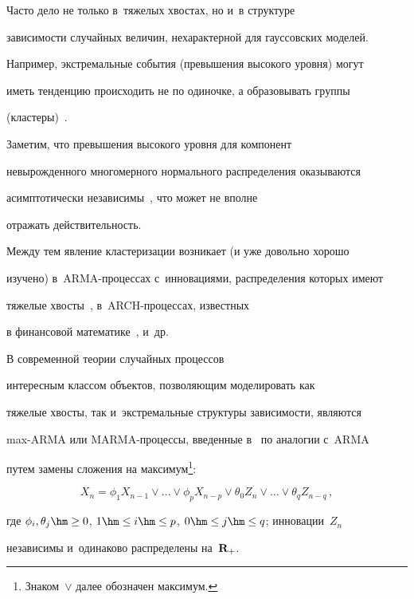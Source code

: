 Часто дело не только в~тяжелых хвостах, но и~в структуре


зависимости случайных величин, нехарактерной для гауссовских моделей.


Например, экстремальные события (превышения высокого уровня) могут


иметь тенденцию происходить не по одиночке, а образовывать группы


(кластеры)~\cite[гл.~8]{EKM}.


Заметим, что превышения высокого уровня для компонент


невырожденного многомерного нормального распределения оказываются


асимптотически независимы~\cite[c.~211]{QRM}, что может не вполне


отражать действительность.





Между тем явление кластеризации возникает (и уже довольно хорошо


изучено) в~ARMA-про\-цес\-сах с~инновациями, распределения которых имеют


тяжелые хвосты~\cite[гл.~5, 7]{EKM}, в~ARCH-процессах, известных


в финансовой математике~\cite[\S~8.4]{EKM}, и~др.





В современной теории случайных процессов


интересным классом объектов, позволяющим моделировать как


тяжелые хвосты, так и~экстремальные структуры зависимости, являются


max-ARMA или MARMA-про\-цес\-сы, введенные в~\cite{DR1, DR2} по аналогии с~ARMA


путем замены сложения на максимум\footnote{Знаком~$\vee$ далее обозначен максимум.}:


\begin{equation}


\label{MARMA}


X_n=\phi_1X_{n-1}\vee\dots\vee\phi_pX_{n-p}\vee\theta_0Z_n\vee\dots


\vee\theta_qZ_{n-q}\,,


\end{equation}


где $\phi_i,\theta_j\hm\ge 0$, $1\hm\le i\hm\le p$, $0\hm\le j\hm\le q$; инновации~$Z_n$ 


независимы и~одинаково распределены на~${\bf R}_+$.





